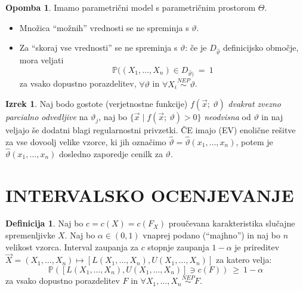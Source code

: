\documentclass[11pt]{article}
\newcommand{\p}{\mathbb{P}}
\newcommand{\1}{\mathbbm{1}}
\theoremstyle{definition}
\newtheorem{definicija}{Definicija}[section]
\theoremstyle{definition}
\theoremstyle{definition}
\newtheorem{izrek}{Izrek}[section]
\newtheorem*{opomba}{Opomba}
\begin{document}
\begin{opomba}

Imamo parametrični model s parametričnim prostorom $\Theta$.
\begin{itemize}
	
	\item Množica ``možnih'' vrednosti se ne spreminja s $\vartheta$.
	
	\item Za ``skoraj vse vrednosti'' se ne spreminja s $\vartheta$: če je $D_{\hat{\vartheta}}$ definicijsko območje, mora veljati
	$$\p((X_1, \ldots, X_n) \in D_{\hat{\vartheta})} ~=~ 1$$
	za vsako dopustno porazdelitev, $\forall \vartheta$ in $\forall X_i \overset{NEP}{\sim} \vartheta$.	
	
\end{itemize}

\end{opomba}
\vspace{0.5cm}

\begin{izrek}

Naj bodo gostote (verjetnostne funkcije) $f(\vec{x};~\vartheta)$ \textit{dvakrat zvezno parcialno odvedljive} na $\vartheta_j$, naj bo $\{ \vec{x} \mid f(\vec{x};~\vartheta) > 0 \}$ \textit{neodvisna} od $\vartheta$ in naj veljajo še dodatni blagi regularnostni privzetki. ČE imajo (EV) enolične rešitve za vse dovoolj velike vzorce, ki jih označimo $\hat{\vartheta} = \hat{\vartheta}(x_1, \ldots, x_n)$, potem je $\hat{\vartheta}(x_1, \ldots, x_n)$ dosledno zaporedje cenilk za $\vartheta$.

\end{izrek}
\vspace{0.5cm}


\pagebreak


\section{INTERVALSKO OCENJEVANJE}
\vspace{0.5cm}

\begin{definicija}

Naj bo $c = c(X) = c(F_X)$ proučevana karakteristika slučajne spremenljivke $X$. Naj bo $\alpha \in (0, 1)$ vnaprej podano (``majhno'')  in naj bo $n$ velikost vzorca. Interval zaupanja za $c$ stopnje zaupanja $1 - \alpha$ je prireditev $\vec{X} = (X_1, \ldots, X_n) \mapsto [L(X_1, \ldots, X_n), U(X_1, \ldots, X_n)]$ za katero velja:
$$\p([L(X_1, \ldots, X_n), U(X_1, \ldots, X_n)] \ni c(F)) ~\geq~ 1 - \alpha$$
za vsako dopustno porazdelitev $F$ in $\forall X_1, \ldots, X_n \overset{NEP}{\sim} F$.

\end{definicija}
\vspace{0.5cm}
\end{document}
